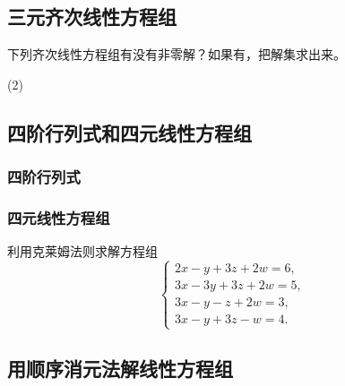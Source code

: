 \subsection{三元齐次线性方程组}
\begin{Practice}
  下列齐次线性方程组有没有非零解？如果有，把解集求出来。
  \begin{tasks}(2)
    \task 
    \task 
  \end{tasks}
\end{Practice}

\subsection{四阶行列式和四元线性方程组}
\subsubsection{四阶行列式}
\begin{Practice}
  \begin{question}
    \item 
    \item 
  \end{question}
\end{Practice}

\subsubsection{四元线性方程组}
\begin{Practice}
  利用克莱姆法则求解方程组
  \[ \begin{cases} 2x-y+3z+2w=6,\\3x-3y+3z+2w=5, \\3x-y-z+2w=3, \\ 3x-y+3z-w=4. \end{cases}\]
\end{Practice}

\begin{Exercise}
  \begin{question}
    \item 
    \item 
    \item 
    \item 
    \item 
    \item 
  \end{question}
\end{Exercise}

\subsection{用顺序消元法解线性方程组}
